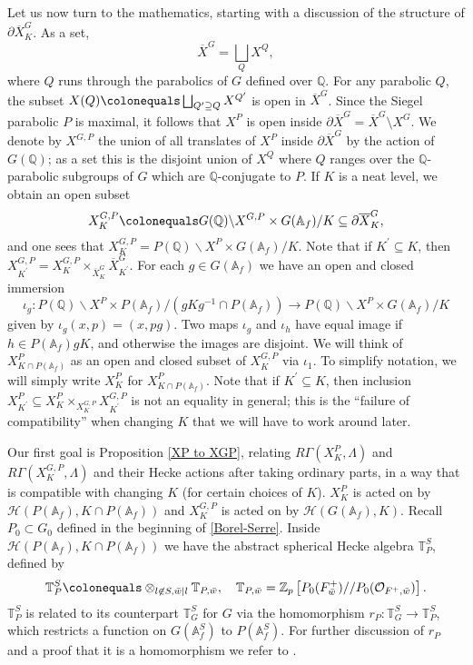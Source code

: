 \documentclass{amsart}
\theoremstyle{remark}
\numberwithin{equation}{subsection}
\newcommand{\A}{\AA}
\newcommand{\Q}{\QQ}
\newcommand{\Z}{\ZZ}
\renewcommand{\AA}{{\mathbb A}}
\newcommand{\QQ}{{\mathbb Q}}
\newcommand{\ZZ}{{\mathbb Z}}
\newcommand{\cH}{{\mathcal H}}
\newcommand{\cO}{{\mathcal O}}
\newcommand{\ol}{\overline}
\newcommand{\sub}{\subseteq}
\newcommand{\defeq}{\colonequals}
\renewcommand{\(}{\left(}
\renewcommand{\)}{\right)}
\begin{document}
\medskip

Let us now turn to the mathematics, starting with a discussion of the structure of $\partial \ol{X}_K^G$. As a set, 
\[
\ol{X}^G = \bigsqcup_Q X^Q,
\]
where $Q$ runs through the parabolics of $G$ defined over $\Q$. For any parabolic $Q$, the subset $X(Q) \defeq \bigsqcup_{Q^\prime \supseteq Q} X^{Q^\prime}$ is open in $\ol{X}^G$. Since the Siegel parabolic $P$ is maximal, it follows that $X^P$ is open inside $\partial \ol{X}^G = \ol{X}^G \setminus X^G$. We denote by $X^{G,P}$ the union of all translates of $X^P$ inside $\partial \ol{X}^G$ by the action of $G(\Q)$; as a set this is the disjoint union of $X^Q$ where $Q$ ranges over the $\Q$-parabolic subgroups of $G$ which are $\Q$-conjugate to $P$. If $K$ is a neat level, we obtain an open subset
\[
X^{G,P}_K \defeq G(\Q) \backslash X^{G,P} \times G(\A_f)/K \sub \partial \ol{X}^G_K,
\]
and one sees that $X^{G,P}_K= P(\Q) \backslash X^{P} \times G(\A_f)/K$. Note that if $K^\prime \sub K$, then $X^{G,P}_{K^\prime} = X^{G,P}_K \times_{\ol{X}^G_K} \ol{X}^G_{K^\prime}$. For each $g\in  G(\A_f)$ we have an open and closed immersion
\[
\iota_g : P(\Q) \backslash X^{P} \times P(\A_f)/(gKg^{-1} \cap P(\A_f)) \to P(\Q) \backslash X^{P} \times G(\A_f)/K
\]
given by $\iota_g(x,p) = (x,pg)$. Two maps $\iota_g$ and $\iota_h$ have equal image if $h\in P(\A_f)gK$, and otherwise the images are disjoint. We will think of $X^P_{K\cap P(\A_f)}$ as an open and closed subset of $X^{G,P}_K$ via $\iota_1$. To simplify notation, we will simply write $X^P_K$ for $X^P_{K\cap P(\A_f)}$. Note that if $K^\prime \sub K$, then inclusion $X^P_{K^\prime} \sub X^P_K \times_{X^{G,P}_K}X^{G,P}_{K^\prime}$ is not an equality in general; this is the ``failure of compatibility'' when changing $K$ that we will have to work around later.

\medskip

Our first goal is Proposition \ref{XP to XGP}, relating $R\Gamma(X^P_K,\Lambda)$ and $R\Gamma(X^{G,P}_K,\Lambda)$ and their Hecke actions after taking ordinary parts, in a way that is compatible with changing $K$ (for certain choices of $K$). $X_K^P$ is acted on by $\cH(P(\A_f),K\cap P(\A_f))$ and $X^{G,P}_K$ is acted on by $\cH(G(\A_f),K)$. Recall $P_0\subset G_0$ defined in the beginning of \ref{Borel-Serre}. Inside $\cH(P(\A_f),K\cap P(\A_f))$ we have
the abstract spherical Hecke algebra $\mathbb{T}^S_P$, defined by 
\[
\mathbb{T}^S_P \defeq \otimes_{l\not\in S, \bar{w}\mid l}\mathbb{T}_{P,\bar{w}}, \quad \mathbb{T}_{P,\bar{w}} = \Z_p\left[P_0(F^+_{\bar{w}})/ /P_0(\cO_{F^+,\bar{w}})\right].
\]
$\mathbb{T}_P^S$ is related to its counterpart $\mathbb{T}_G^S$ for $G$ via the homomorphism $r_P \colon \mathbb{T}^S_G\to \mathbb{T}^S_{P}$, which restricts a function on $G(\A_f^S)$ to $P(\A_f^S)$. For further discussion of $r_P$ and a proof that it is a homomorphism we refer to \cite[\S 2.2.3]{newton-thorne}.
\end{document}
